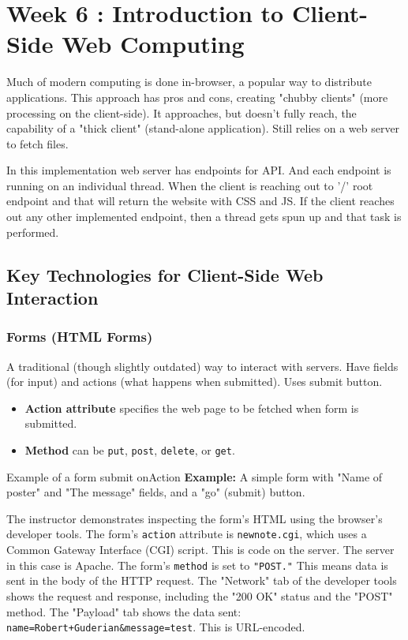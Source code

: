 \section{Week 6 : Introduction to Client-Side Web Computing}
Much of modern computing is done in-browser, a popular way to distribute applications. This approach has pros and cons, creating "chubby clients" (more processing on the client-side). It approaches, but doesn't fully reach, the capability of a "thick client" (stand-alone application). Still relies on a web server to fetch files.

In this implementation web server has endpoints for API. And each endpoint is running on an individual thread. When the client is reaching out to '/' root endpoint and that will return the website with CSS and JS. If the client reaches out any other implemented endpoint, then a thread gets spun up and that task is performed. 


\subsection{Key Technologies for Client-Side Web Interaction}
\subsubsection{Forms (HTML Forms)}
A traditional (though slightly outdated) way to interact with servers. Have fields (for input) and actions (what happens when submitted). Uses submit button.
\begin{itemize}
    \item \textbf{Action attribute} specifies the web page to be fetched when form is submitted.
    \item \textbf{Method} can be \texttt{put}, \texttt{post}, \texttt{delete}, or \texttt{get}.
\end{itemize}


\begin{example}{Example of a form submit onAction}
\textbf{Example:} A simple form with "Name of poster" and "The message" fields, and a "go" (submit) button.
\end{example}

The instructor demonstrates inspecting the form's HTML using the browser's developer tools. The form's \texttt{action} attribute is \texttt{newnote.cgi}, which uses a Common Gateway Interface (CGI) script. This is code on the server. The server in this case is Apache.
The form's \texttt{method} is set to \texttt{"POST."} This means data is sent in the body of the HTTP request. The "Network" tab of the developer tools shows the request and response, including the "200 OK" status and the "POST" method. The "Payload" tab shows the data sent: \texttt{name=Robert+Guderian\&message=test}. This is URL-encoded.

